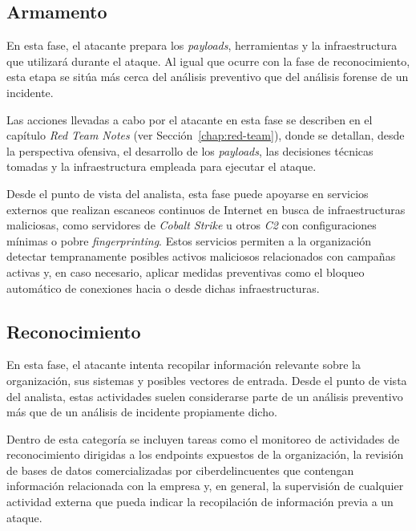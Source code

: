 \subsection{Armamento}

En esta fase, el atacante prepara los \textit{payloads}, herramientas y la infraestructura que utilizará durante el ataque. Al igual que ocurre con la fase de reconocimiento, esta etapa se sitúa más cerca del análisis preventivo que del análisis forense de un incidente.

Las acciones llevadas a cabo por el atacante en esta fase se describen en el capítulo \textit{Red Team Notes} (ver Sección~\ref{chap:red-team}), donde se detallan, desde la perspectiva ofensiva, el desarrollo de los \textit{payloads}, las decisiones técnicas tomadas y la infraestructura empleada para ejecutar el ataque.

Desde el punto de vista del analista, esta fase puede apoyarse en servicios externos que realizan escaneos continuos de Internet en busca de infraestructuras maliciosas, como servidores de \textit{Cobalt Strike} u otros \textit{C2} con configuraciones mínimas o pobre \textit{fingerprinting}. Estos servicios permiten a la organización detectar tempranamente posibles activos maliciosos relacionados con campañas activas y, en caso necesario, aplicar medidas preventivas como el bloqueo automático de conexiones hacia o desde dichas infraestructuras.

\subsection{Reconocimiento}

En esta fase, el atacante intenta recopilar información relevante sobre la organización, sus sistemas y posibles vectores de entrada. Desde el punto de vista del analista, estas actividades suelen considerarse parte de un análisis preventivo más que de un análisis de incidente propiamente dicho.

Dentro de esta categoría se incluyen tareas como el monitoreo de actividades de reconocimiento dirigidas a los endpoints expuestos de la organización, la revisión de bases de datos comercializadas por ciberdelincuentes que contengan información relacionada con la empresa y, en general, la supervisión de cualquier actividad externa que pueda indicar la recopilación de información previa a un ataque.